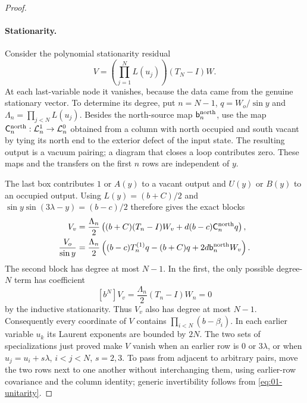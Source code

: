 \begin{proof}
\paragraph{Stationarity.}
Consider the polynomial stationarity residual
\[
 V=\left(\prod_{j=1}^N L(u_j)\right)(T_N-I)W.
\]
At each last-variable node it vanishes, because the data came from
the genuine stationary vector. To determine its degree, put $n=N-1$,
$q=W_o/\sin y$ and $\Lambda_n=\prod_{j<N}L(u_j)$. Besides the north-source
map $\mathsf b_n^{\rm north}$, use the map
$\mathsf C_n^{\rm north}:\mathcal L_n^1\to\mathcal L_n^0$ obtained
from a column with north occupied and south vacant by tying its north
end to the exterior defect of the input state. The resulting output
is a vacuum pairing; a diagram that closes a loop contributes zero.
These maps and the transfers on the first $n$ rows are independent of
$y$.

The last box contributes $1$ or $A(y)$ to a vacant output and $U(y)$
or $B(y)$ to an occupied output. Using
$L(y)=(b+C)/2$ and
$\sin y\sin(3\lambda-y)=(b-c)/2$ therefore gives the exact blocks
\begin{align}
 V_v&=\frac{\Lambda_n}2\left((b+C)(T_n-I)W_v
                 +d(b-c)\mathsf C_n^{\rm north}q\right),
                 \label{eq:vacuum-residual-vacant}\\
 \frac{V_o}{\sin y}
   &=\frac{\Lambda_n}2\left((b-c)T_n^{(1)}q-(b+C)q
                 +2d\mathsf b_n^{\rm north}W_v\right).
                 \label{eq:vacuum-residual-occupied}
\end{align}
The second block has degree at most $N-1$. In the first, the only
possible degree-$N$ term has coefficient
\[
 [b^N]V_v=\frac{\Lambda_n}2(T_n-I)W_n=0
\]
by the inductive stationarity. Thus $V_v$ also has degree at most
$N-1$. Consequently every
coordinate of $V$ contains $\prod_{i<N}(b-\beta_i)$.
In each earlier variable $u_k$ its Laurent exponents are bounded by
$2N$. The two sets of specializations just proved make $V$ vanish
when an earlier row is $0$ or $3\lambda$, or when
$u_j=u_i+s\lambda$, $i<j<N$, $s=2,3$. To pass from adjacent to
arbitrary pairs, move the two rows next to one another without
interchanging them, using earlier-row covariance and the column
identity; generic invertibility follows from
\eqref{eq:01-unitarity}.


\end{proof}
